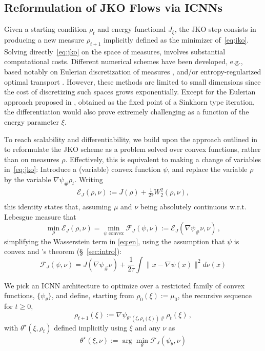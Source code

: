 \subsection{Reformulation of JKO Flows via ICNNs} \label{sec:jko_icnn}
Given a starting condition $\rho_t$ and energy functional $J_\xi$, the JKO step consists in producing a new measure $\rho_{t+1}$ implicitly defined as the minimizer of~\eqref{eq:jko}. Solving directly~\eqref{eq:jko} on the space of measures, involves substantial computational costs. Different numerical schemes have been developed, e.g., based notably on Eulerian discretization of measures \citep{carrillo2021primal, benamou2016}, and/or entropy-regularized optimal transport \citep{peyre2015entropic}. However, these methods are limited to small dimensions since the cost of discretizing such spaces grows exponentially. Except for the Eulerian approach proposed in \citep{peyre2015entropic}, obtained as the fixed point of a Sinkhorn type iteration, the differentiation would also prove extremely challenging as a function of the energy parameter $\xi$.

 To reach scalability and differentiability, we build upon the approach outlined in \citet{benamou2016} to reformulate the JKO scheme as a problem solved over convex functions, rather than on measures $\rho$. Effectively, this is equivalent to making a change of variables in~\eqref{eq:jko}: Introduce a (variable) convex function $\psi$, and replace the variable $\rho$ by the variable $\nabla \psi_{\#}\rho_t$. Writing
\begin{equation}\label{eq:en}
\begin{split}
\mathcal{E}_J(\rho, \nu) := J(\rho) +\frac{1}{2 \tau}W_2^2(\rho, \nu),\\
\end{split}
\end{equation}
this identity states that, assuming $\mu$ and $\nu$ being absolutely continuous w.r.t. Lebesgue measure that
$$\min_{\rho}\mathcal{E}_J(\rho,\nu) = \min_{\psi \text{ convex}} \mathcal{F}_J(\psi, \nu):= \mathcal{E}_J(\nabla \psi_{\#}\nu, \nu)\,,$$
simplifying the Wasserstein term in \eqref{eq:en}, using the assumption that $\psi$ is convex and \citeauthor{Brenier1987}'s theorem (\S~\ref{sec:intro}):
\begin{equation}\mathcal{F}_J(\psi, \nu) = J(\nabla \psi_{\#}\nu) +\frac{1}{2 \tau} \!\! \int\!\! \| x - \nabla \psi(x) \|^2 d \nu(x)\label{eq:JKO_psi}
\end{equation}

We pick an ICNN architecture to optimize over a restricted family of convex functions, $\{\psi_{\theta}\}$, and define, starting from $\rho_0(\xi):=\mu_0$, the recursive sequence for $t\geq 0$,
\begin{equation} \label{eq:next_pop}
\rho_{t+1}(\xi) := \nabla \psi_{\theta^\star\!(\xi, \rho_t(\xi))\, \#}\, \rho_{t}(\xi)\,,
\end{equation}
with $\theta^\star(\xi, \rho_t)$ defined implicitly using $\xi$ and any $\nu$ as 
\begin{align} \label{eq:thetastar}
    \theta^\star(\xi, \nu):=\arg \min_{\theta} \mathcal{F}_J(\psi_{\theta},\nu)
\end{align}

